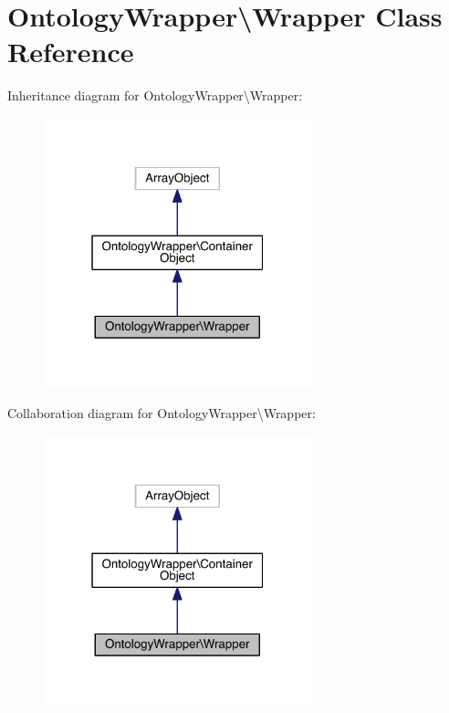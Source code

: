 \hypertarget{class_ontology_wrapper_1_1_wrapper}{\section{Ontology\-Wrapper\textbackslash{}Wrapper Class Reference}
\label{class_ontology_wrapper_1_1_wrapper}
}


Inheritance diagram for Ontology\-Wrapper\textbackslash{}Wrapper\-:
\nopagebreak
\begin{figure}[H]
\begin{center}
\leavevmode
\includegraphics[width=220pt]{class_ontology_wrapper_1_1_wrapper__inherit__graph}
\end{center}
\end{figure}


Collaboration diagram for Ontology\-Wrapper\textbackslash{}Wrapper\-:
\nopagebreak
\begin{figure}[H]
\begin{center}
\leavevmode
\includegraphics[width=220pt]{class_ontology_wrapper_1_1_wrapper__coll__graph}
\end{center}
\end{figure}
